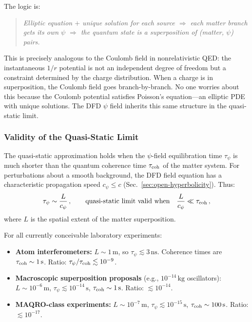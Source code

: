 The logic is:
\begin{quote}
\emph{Elliptic equation $+$ unique solution for each source $\Rightarrow$ each matter branch gets its own $\psi$ $\Rightarrow$ the quantum state is a superposition of (matter, $\psi$) pairs.}
\end{quote}

This is precisely analogous to the Coulomb field in nonrelativistic QED: the instantaneous $1/r$ potential is not an independent degree of freedom but a constraint determined by the charge distribution.  When a charge is in superposition, the Coulomb field goes branch-by-branch.  No one worries about this because the Coulomb potential satisfies Poisson's equation---an elliptic PDE with unique solutions.  The DFD $\psi$ field inherits this same structure in the quasi-static limit.

\subsubsection{Validity of the Quasi-Static Limit}

The quasi-static approximation holds when the $\psi$-field equilibration time $\tau_\psi$ is much shorter than the quantum coherence time $\tau_{\rm coh}$ of the matter system.  For perturbations about a smooth background, the DFD field equation has a characteristic propagation speed $c_\psi \leq c$ (Sec.~\ref{sec:open-hyperbolicity}).  Thus:
\begin{equation}\label{eq:quasi-static-criterion}
\tau_\psi \sim \frac{L}{c_\psi}\,, \qquad \text{quasi-static limit valid when}\quad \frac{L}{c_\psi} \ll \tau_{\rm coh}\,,
\end{equation}
where $L$ is the spatial extent of the matter superposition.

For all currently conceivable laboratory experiments:
\begin{itemize}
\item \textbf{Atom interferometers:} $L \sim 1\,\text{m}$, so $\tau_\psi \lesssim 3\,\text{ns}$.  Coherence times are $\tau_{\rm coh} \sim 1\,\text{s}$.  Ratio: $\tau_\psi/\tau_{\rm coh} \lesssim 10^{-9}$.
\item \textbf{Macroscopic superposition proposals} (e.g., $10^{-14}\,\text{kg}$ oscillators): $L \sim 10^{-6}\,\text{m}$, $\tau_\psi \lesssim 10^{-14}\,\text{s}$, $\tau_{\rm coh} \sim 1\,\text{s}$.  Ratio: $\lesssim 10^{-14}$.
\item \textbf{MAQRO-class experiments:} $L \sim 10^{-7}\,\text{m}$, $\tau_\psi \lesssim 10^{-15}\,\text{s}$, $\tau_{\rm coh} \sim 100\,\text{s}$.  Ratio: $\lesssim 10^{-17}$.
\end{itemize}

